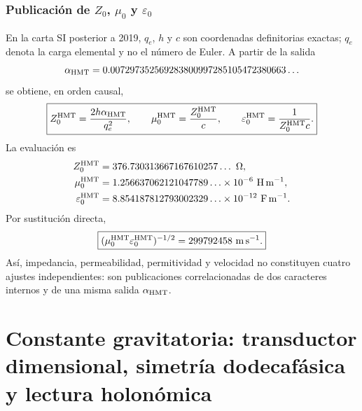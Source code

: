 \subsection{Publicación de \texorpdfstring{\(Z_0\), \(\mu_0\) y
\(\varepsilon_0\)}{Z0, mu0 y epsilon0}}

En la carta SI posterior a 2019, \(q_e\), \(h\) y \(c\) son coordenadas
definitorias exactas; \(q_e\) denota la carga elemental y no el número de
Euler. A partir de la salida
\[
 \alpha_{\rm HMT}
 =0.007297352569283800997285105472380663\ldots
\]
se obtiene, en orden causal,
\begin{equation}
 \label{eq:amp18-constantes-vacio-si}
 \boxed{
 Z_0^{\rm HMT}=\frac{2h\alpha_{\rm HMT}}{q_e^2},
 \qquad
 \mu_0^{\rm HMT}=\frac{Z_0^{\rm HMT}}c,
 \qquad
 \varepsilon_0^{\rm HMT}=\frac1{Z_0^{\rm HMT}c}.}
\end{equation}
La evaluación es
\begin{equation}
 \label{eq:amp18-constantes-vacio-valores}
 \begin{aligned}
 Z_0^{\rm HMT}
 &=376.730313667167610257\ldots\ \Omega,\\
 \mu_0^{\rm HMT}
 &=1.256637062121047789\ldots\times10^{-6}\
   \mathrm{H\,m^{-1}},\\
 \varepsilon_0^{\rm HMT}
 &=8.854187812793002329\ldots\times10^{-12}\
   \mathrm{F\,m^{-1}}.
 \end{aligned}
\end{equation}
Por sustitución directa,
\begin{equation}
 \label{eq:amp18-constantes-velocidad-vacio}
 \boxed{
 (\mu_0^{\rm HMT}\varepsilon_0^{\rm HMT})^{-1/2}
 =299792458\ \mathrm{m\,s^{-1}}.}
\end{equation}
Así, impedancia, permeabilidad, permitividad y velocidad no constituyen cuatro
ajustes independientes: son publicaciones correlacionadas de dos caracteres
internos y de una misma salida \(\alpha_{\rm HMT}\).

\chapter[Constante gravitatoria]{Constante gravitatoria: transductor
dimensional, simetría dodecafásica y lectura holonómica}

